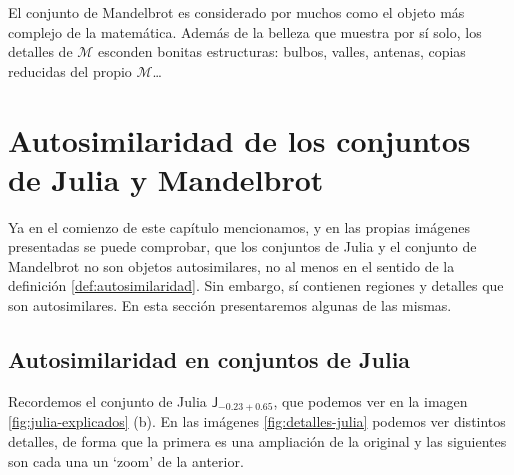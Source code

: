 El conjunto de Mandelbrot es considerado por muchos como el objeto más complejo de la matemática. Además de la belleza que muestra por sí solo, los detalles de $\mathcal{M}$ esconden bonitas estructuras: bulbos, valles, antenas, copias reducidas del propio $\mathcal{M}$\dots

\section{Autosimilaridad de los conjuntos de Julia y Mandelbrot}

Ya en el comienzo de este capítulo mencionamos, y en las propias imágenes presentadas se puede comprobar, que los conjuntos de Julia y el conjunto de Mandelbrot no son objetos autosimilares, no al menos en el sentido de la definición \ref{def:autosimilaridad}. Sin embargo, sí contienen regiones y detalles que son autosimilares. En esta sección presentaremos algunas de las mismas.

\subsection{Autosimilaridad en conjuntos de Julia}

Recordemos el conjunto de Julia $\mathsf{J}_{-0.23+0.65}$, que podemos ver en la imagen \ref{fig:julia-explicados} (b). En las imágenes \ref{fig:detalles-julia} podemos ver distintos detalles, de forma que la primera es una ampliación de la original y las siguientes son cada una un `zoom' de la anterior.

